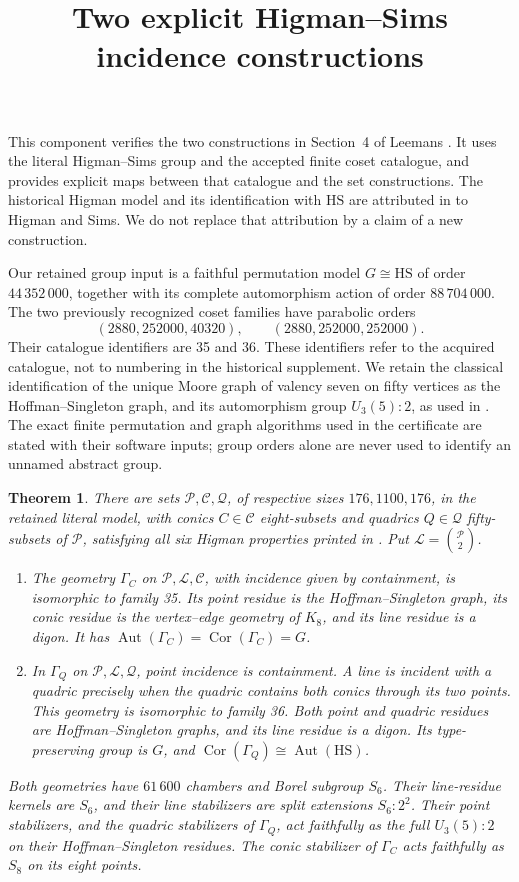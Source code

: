 \documentclass[11pt]{article}
\title{Two explicit Higman--Sims incidence constructions}
\author{}\date{}
\newtheorem{theorem}{Theorem}
\newcommand{\HS}{\mathrm{HS}}
\newcommand{\Aut}{\operatorname{Aut}}
\newcommand{\Cor}{\operatorname{Cor}}
\begin{document}
\maketitle
\vspace{-12mm}
\noindent
This component verifies the two constructions in Section~4 of Leemans
\cite{L}.  It uses the literal Higman--Sims group and the accepted finite
coset catalogue, and provides explicit maps between that catalogue and
the set constructions.  The historical Higman model and its identification
with $\HS$ are attributed in \cite{L} to Higman and Sims.  We do not replace
that attribution by a claim of a new construction.

Our retained group input is a faithful permutation model $G\cong\HS$ of
order $44\,352\,000$, together with its complete automorphism action of
order $88\,704\,000$.  The two previously recognized coset families have
parabolic orders
\[
 (2880,252000,40320),\qquad (2880,252000,252000).                 \tag{1}
\]
Their catalogue identifiers are 35 and 36.  These identifiers refer to
the acquired catalogue, not to numbering in the historical supplement.
We retain the classical identification of the unique Moore graph of
valency seven on fifty vertices as the Hoffman--Singleton graph, and its
automorphism group $U_3(5):2$, as used in \cite[Section~4]{L}.
The exact finite permutation and graph algorithms used in the certificate
are stated with their software inputs; group orders alone are never used
to identify an unnamed abstract group.

\begin{theorem}\label{thm:main}
There are sets $\mathcal P,\mathcal C,\mathcal Q$, of respective sizes
$176,1100,176$, in the retained literal model, with conics
$C\in\mathcal C$ eight-subsets and quadrics $Q\in\mathcal Q$
fifty-subsets of $\mathcal P$, satisfying all six Higman properties
printed in \cite[Section~4.1]{L}.  Put
$\mathcal L=\binom{\mathcal P}{2}$.
\begin{enumerate}
\item The geometry $\Gamma_C$ on $\mathcal P,\mathcal L,\mathcal C$,
with incidence given by containment, is isomorphic to family 35.
Its point residue is the Hoffman--Singleton graph, its conic residue is
the vertex--edge geometry of $K_8$, and its line residue is a digon.
It has $\Aut(\Gamma_C)=\Cor(\Gamma_C)=G$.
\item In $\Gamma_Q$ on $\mathcal P,\mathcal L,\mathcal Q$,
point incidence is containment.  A line is incident with a quadric
precisely when the quadric contains both conics through its two points.
This geometry is isomorphic to family 36.  Both point and quadric
residues are Hoffman--Singleton graphs, and its line residue is a digon.
Its type-preserving group is $G$, and $\Cor(\Gamma_Q)\cong\Aut(\HS)$.
\end{enumerate}
Both geometries have $61\,600$ chambers and Borel subgroup $S_6$.
Their line-residue kernels are $S_6$, and their line stabilizers are
split extensions $S_6:2^2$.  Their point stabilizers, and the quadric
stabilizers of $\Gamma_Q$, act faithfully as the full $U_3(5):2$
on their Hoffman--Singleton residues.  The conic stabilizer of
$\Gamma_C$ acts faithfully as $S_8$ on its eight points.
\end{theorem}
\end{document}
